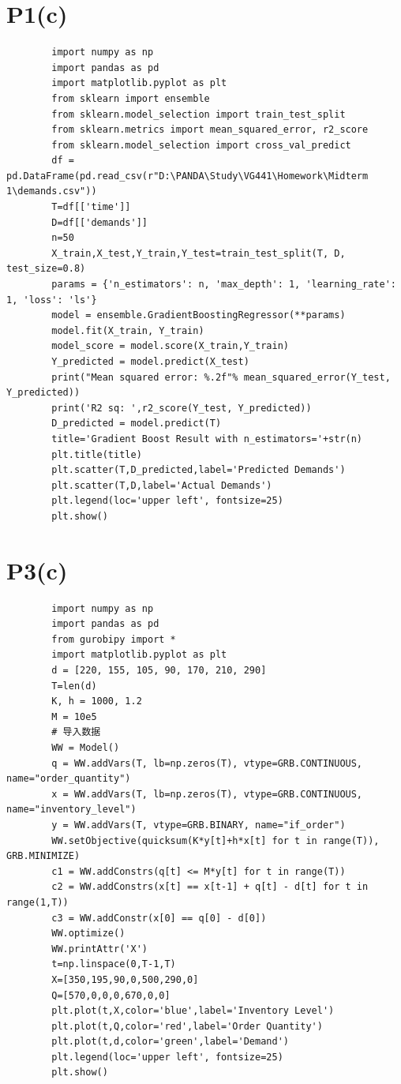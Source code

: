 \documentclass[a4paper]{article}
\begin{document}
\section*{P1(c)}
    \begin{verbatim}
        import numpy as np
        import pandas as pd
        import matplotlib.pyplot as plt
        from sklearn import ensemble
        from sklearn.model_selection import train_test_split
        from sklearn.metrics import mean_squared_error, r2_score
        from sklearn.model_selection import cross_val_predict
        df = pd.DataFrame(pd.read_csv(r"D:\PANDA\Study\VG441\Homework\Midterm 1\demands.csv"))
        T=df[['time']]
        D=df[['demands']]
        n=50
        X_train,X_test,Y_train,Y_test=train_test_split(T, D, test_size=0.8)
        params = {'n_estimators': n, 'max_depth': 1, 'learning_rate': 1, 'loss': 'ls'}
        model = ensemble.GradientBoostingRegressor(**params)
        model.fit(X_train, Y_train)
        model_score = model.score(X_train,Y_train)
        Y_predicted = model.predict(X_test)
        print("Mean squared error: %.2f"% mean_squared_error(Y_test, Y_predicted))
        print('R2 sq: ',r2_score(Y_test, Y_predicted))
        D_predicted = model.predict(T)
        title='Gradient Boost Result with n_estimators='+str(n)
        plt.title(title)
        plt.scatter(T,D_predicted,label='Predicted Demands')
        plt.scatter(T,D,label='Actual Demands')
        plt.legend(loc='upper left', fontsize=25)
        plt.show()
    \end{verbatim}
    \section*{P3(c)}
    \begin{verbatim}
        import numpy as np
        import pandas as pd
        from gurobipy import *
        import matplotlib.pyplot as plt
        d = [220, 155, 105, 90, 170, 210, 290]
        T=len(d)
        K, h = 1000, 1.2
        M = 10e5
        # 导入数据
        WW = Model()
        q = WW.addVars(T, lb=np.zeros(T), vtype=GRB.CONTINUOUS, name="order_quantity")
        x = WW.addVars(T, lb=np.zeros(T), vtype=GRB.CONTINUOUS, name="inventory_level")
        y = WW.addVars(T, vtype=GRB.BINARY, name="if_order")
        WW.setObjective(quicksum(K*y[t]+h*x[t] for t in range(T)), GRB.MINIMIZE)
        c1 = WW.addConstrs(q[t] <= M*y[t] for t in range(T))
        c2 = WW.addConstrs(x[t] == x[t-1] + q[t] - d[t] for t in range(1,T))
        c3 = WW.addConstr(x[0] == q[0] - d[0])
        WW.optimize()
        WW.printAttr('X')
        t=np.linspace(0,T-1,T)
        X=[350,195,90,0,500,290,0]
        Q=[570,0,0,0,670,0,0]
        plt.plot(t,X,color='blue',label='Inventory Level')
        plt.plot(t,Q,color='red',label='Order Quantity')
        plt.plot(t,d,color='green',label='Demand')
        plt.legend(loc='upper left', fontsize=25)
        plt.show()
    \end{verbatim}
\end{document}
